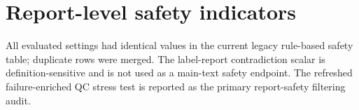 \documentclass[11pt,a4paper]{article}
\begin{document}
\section*{Report-level safety indicators}
\begin{table}[!htbp]
  \centering
  \caption{Supplementary Table S9. Report-level safety metrics.}
  \label{tab:s9_report_safety_metrics}
  \scriptsize
  \begin{threeparttable}
  \begin{tablenotes}[flushleft]
    \footnotesize
    \item All evaluated settings had identical values in the current legacy rule-based safety table; duplicate rows were merged. The label-report contradiction scalar is definition-sensitive and is not used as a main-text safety endpoint. The refreshed failure-enriched QC stress test is reported as the primary report-safety filtering audit.
  \end{tablenotes}
  \end{threeparttable}
\end{table}
\end{document}
